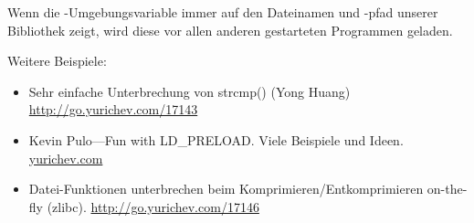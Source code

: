 Wenn die -Umgebungsvariable immer auf den Dateinamen und -pfad unserer
Bibliothek zeigt, wird diese vor allen anderen gestarteten Programmen geladen.

Weitere Beispiele:

\begin{itemize}

\item
Sehr einfache Unterbrechung von strcmp() (Yong Huang)
\url{http://go.yurichev.com/17143}

\item
Kevin Pulo---Fun with LD\_PRELOAD. Viele Beispiele und Ideen.
\href{http://go.yurichev.com/17145}{yurichev.com}

\item
Datei-Funktionen unterbrechen beim Komprimieren/Entkomprimieren on-the-fly (zlibc). \url{http://go.yurichev.com/17146}
\end{itemize}
